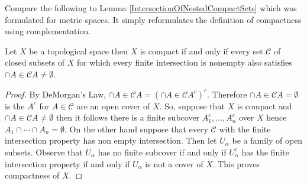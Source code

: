 Compare the following to Lemma \ref{IntersectionOfNestedCompactSets} which was formulated for metric spaces.  It simply reformulates the definition of compactness using complementation.
\begin{lem}\label{IntersectionsOfClosedSetsAndCompactness}Let $X$ be a topological space then $X$ is compact if and only if every set $\mathcal{C}$ of closed subsets of $X$ for which
every finite intersection is nonempty also satisfies $\cap{A \in \mathcal{C}} A \neq \emptyset$.
\end{lem}
\begin{proof}
By DeMorgan's Law, $\cap{A \in \mathcal{C}} A = \left(\cap{A \in \mathcal{C}} A^c \right)^c$.  Therefore $\cap{A \in \mathcal{C}} A = \emptyset$ is the $A^c$ for $A \in \mathcal{C}$ are an open cover of $X$.  So, suppose that $X$ is compact and $\cap{A \in \mathcal{C}} A \neq \emptyset$ then it follows there is a finite subcover $A_1^c, \dotsc, A_n^c$ over $X$ hence $A_1 \cap \dotsb \cap A_n = \emptyset$.  On the other hand suppose that every $\mathcal{C}$ with the finite intersection property has non empty intersection.  Then let $U_\alpha$ be a family of open subsets.  Observe that $U_\alpha$ has no finite subcover if and only if $U_\alpha^c$ has the finite intersection property if and only if $U_\alpha$ is not a cover of $X$.  This proves compactness of $X$. 
\end{proof}


